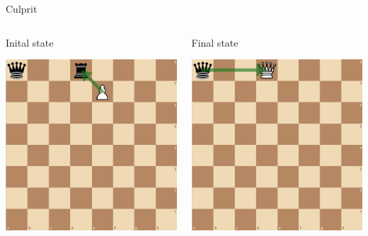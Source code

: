 \documentclass[presentation, 8pt]{beamer}
\begin{document}
\begin{frame}[label={sec:org1ba6897}]{Culprit}
\begin{columns}
\begin{column}{0.45\columnwidth}
\begin{block}{Inital state}
\begin{center}
\includegraphics[width=.9\linewidth]{Images/Pawn capture 8th rank.png}
\end{center}
\end{block}
\end{column}
\begin{column}{0.45\columnwidth}
\begin{block}{Final state}
\begin{center}
\includegraphics[width=.9\linewidth]{Images/pawn promote 8th rank.png}
\end{center}
\end{block}
\end{column}
\end{columns}
\end{frame}
\end{document}
